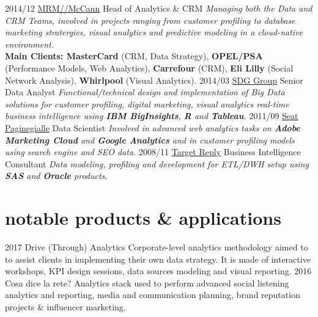 \documentclass[]{gabrielebaldassarre-cv}
\begin{document}
\begin{entrylist}
  \entry
    {2014/12}
    {\href{https://mrm-mccann.com/locations/it/en/milan.html}{MRM//McCann}}
    {Head of Analytics \& CRM}
    {\emph{Managing both the Data and CRM Teams, involved in projects ranging from
customer profiling to database marketing stratergies, visual analytics and predictive modeling in a cloud-native environment.}\\

    \textbf{Main Clients: MasterCard} (CRM, Data Strategy), \textbf{OPEL/PSA} (Performance Models, Web Analytics), \textbf{Carrefour} (CRM), \textbf{Eli Lilly} (Social Network Analysis), \textbf{Whirlpool} (Visual Analytics).}
  \entry
    {2014/03}
    {\href{http://www.sdggroup.com/it}{SDG Group}}
    {Senior Data Analyst}
    {\emph{Functional/technical design and implementation of Big Data solutions for customer profiling, digital marketing, visual analytics real-time business intelligence using \textbf{IBM BigInsights}, \textbf{R} and \textbf{Tableau}.}}
  \entry
    {2011/09}
    {\href{http://www.paginegialle.it}{Seat Paginegialle}}
    {Data Scientist}
    {\emph{Involved in advanced web analytics tasks on \textbf{Adobe Marketing Cloud} and \textbf{Google Analytics} and in customer profiling models using search engine and SEO data.}}
  \entry
    {2008/11}
    {\href{https://www.reply.com/it/topics/big-data-and-analytics/homepage}{Target Reply}}
    {Business Intelligence Consultant}
    {\emph{Data modeling, profiling and development for ETL/DWH setup using \textbf{SAS} and \textbf{Oracle} products.}}
\end{entrylist}

\section{notable products \& applications}

\begin{entrylist}
  \entry
    {2017}
    {Drive (Through) Analytics}
    {}
    {Corporate-level analytics methodology aimed to to assist clients in implementing their own data strategy. It is made of interactive workshops, KPI design sessions, data sources modeling and visual reporting.}
 \entry
    {2016}
    {Cosa dice la rete?}
    {}
    {Analytics stack used to perform advanced social listening analytics and reporting, media and communication planning, brand reputation projects \& influencer marketing.}
\end{entrylist}
\end{document}
